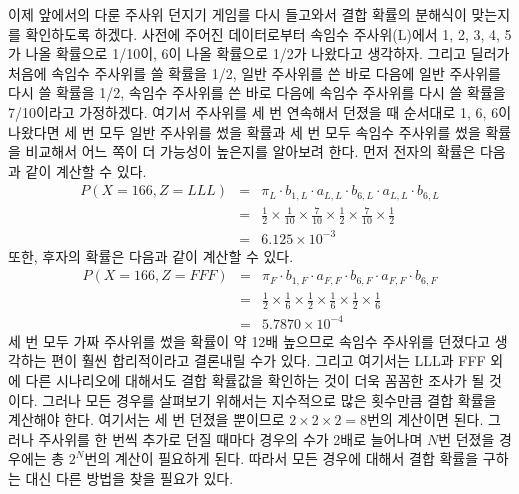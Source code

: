 \documentclass[a4paper]{oblivoir}
\begin{document}
이제 앞에서의 다룬 주사위 던지기 게임를 다시 들고와서 결합 확률의 분해식이 맞는지를 확인하도록 하겠다. 사전에 주어진 데이터로부터 속임수 주사위(L)에서 1, 2, 3, 4, 5가 나올 확률으로 1/10이, 6이 나올 확률으로 1/2가 나왔다고 생각하자. 그리고 딜러가 처음에 속임수 주사위를 쓸 확률을 1/2, 일반 주사위를 쓴 바로 다음에 일반 주사위를 다시 쓸 확률을 1/2, 속임수 주사위를 쓴 바로 다음에 속임수 주사위를 다시 쓸 확률을 7/10이라고 가정하겠다. 여기서 주사위를 세 번 연속해서 던졌을 때 순서대로 1, 6, 6이 나왔다면 세 번 모두 일반 주사위를 썼을 확률과 세 번 모두 속임수 주사위를 썼을 확률을 비교해서 어느 쪽이 더 가능성이 높은지를 알아보려 한다. 먼저 전자의 확률은 다음과 같이 계산할 수 있다. 
\begin{eqnarray}
P(X=166,Z=LLL) & = &  {\pi}_{L} \cdot {b}_{1,L} \cdot {a}_{L,L} \cdot {b}_{6,L} \cdot {a}_{L,L} \cdot {b}_{6,L} \nonumber \\
& = & \frac{1}{2} \times \frac{1}{10} \times \frac{7}{10} \times \frac{1}{2} \times \frac{7}{10} \times \frac{1}{2} \nonumber \\
& = & 6.125 \times 10^{-3} \label{eq:9-8}
\end{eqnarray}
또한, 후자의 확률은 다음과 같이 계산할 수 있다. 
\begin{eqnarray}
P(X=166,Z=FFF) & = & {\pi}_{F} \cdot {b}_{1,F} \cdot {a}_{F,F} \cdot {b}_{6,F} \cdot {a}_{F,F} \cdot {b}_{6,F} \nonumber \\
& = & \frac{1}{2} \times \frac{1}{6} \times \frac{1}{2} \times \frac{1}{6} \times \frac{1}{2} \times \frac{1}{6} \nonumber \\
& = & 5.7870 \times 10^{-4} \label{eq:9-9}
\end{eqnarray}
세 번 모두 가짜 주사위를 썼을 확률이 약 12배 높으므로 속임수 주사위를 던졌다고 생각하는 편이 훨씬 합리적이라고 결론내릴 수가 있다. 그리고 여기서는 LLL과 FFF 외에 다른 시나리오에 대해서도 결합 확률값을 확인하는 것이 더욱 꼼꼼한 조사가 될 것이다. 그러나 모든 경우를 살펴보기 위해서는 지수적으로 많은 횟수만큼 결합 확률을 계산해야 한다. 여기서는 세 번 던졌을 뿐이므로 $2 \times 2 \times 2 = 8$번의 계산이면 된다. 그러나 주사위를 한 번씩 추가로 던질 때마다 경우의 수가 2배로 늘어나며 $N$번 던졌을 경우에는 총 $2^N$번의 계산이 필요하게 된다. 따라서 모든 경우에 대해서 결합 확률을 구하는 대신 다른 방법을 찾을 필요가 있다. \\
\end{document}
